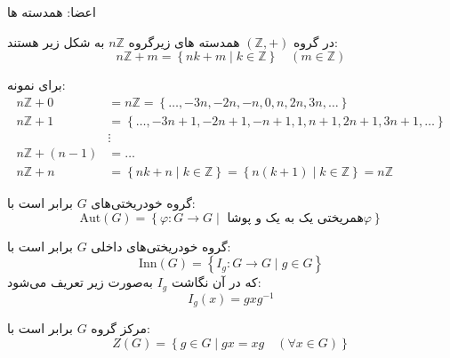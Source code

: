 \begin{remark}
    اعضا: همدسته ها

    در گروه $(\mathbb{Z}, +)$ همدسته های زیرگروه $n\mathbb{Z}$ به شکل زیر هستند:
    \[
        n\mathbb{Z} + m = \left\{ nk + m \mid k \in \mathbb{Z} \right\} \quad (m \in \mathbb{Z})
    \]

    برای نمونه:
    \begin{align*}
        n\mathbb{Z} + 0     & = n\mathbb{Z} = \left\{ \ldots, -3n, -2n, -n, 0, n, 2n, 3n, \ldots \right\}                                   \\
        n\mathbb{Z} + 1     & = \left\{ \ldots, -3n+1, -2n+1, -n+1, 1, n+1, 2n+1, 3n+1, \ldots \right\}                                     \\
                            & \vdots                                                                                                        \\
        n\mathbb{Z} + (n-1) & = \ldots                                                                                                      \\
        n\mathbb{Z} + n     & = \left\{ nk + n \mid k \in \mathbb{Z} \right\} = \left\{ n(k+1) \mid k \in \mathbb{Z} \right\} = n\mathbb{Z}
    \end{align*}
\end{remark}


\begin{definition}
    گروه خودریختی‌های $G$ برابر است با:
    \[
        \mathrm{Aut}(G) = \left\{ \varphi \colon G \to G \mid  \text{ همریختی یک به یک و پوشا} \varphi \right\}
    \]
\end{definition}

\begin{definition}
    گروه خودریختی‌های داخلی $G$ برابر است با:
    \[
        \mathrm{Inn}(G) = \left\{ I_g \colon G \to G \mid g \in G \right\}
    \]
    که در آن نگاشت $I_g$ به‌صورت زیر تعریف می‌شود:
    \[
        I_g(x) = gxg^{-1}
    \]
\end{definition}


\begin{definition}
    مرکز گروه $G$ برابر است با:
    \[
        Z(G) = \left\{ g \in G \mid gx = xg \quad (\forall x \in G) \right\}
    \]
\end{definition}

